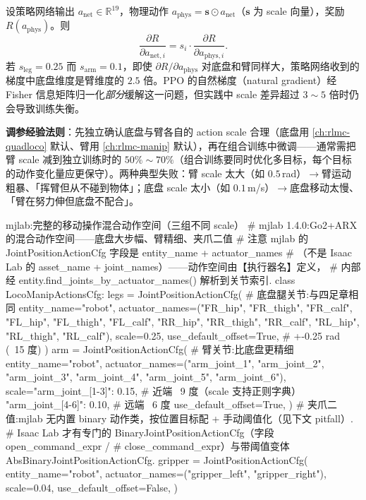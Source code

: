 \begin{derivation}\label{der:rlmc-lm-grad}
设策略网络输出 $a_{\text{net}}\in\mathbb R^{19}$，物理动作 $a_{\text{phys}}=\mathbf s\odot a_{\text{net}}$（$\mathbf s$ 为 scale 向量），奖励 $R(a_{\text{phys}})$。则
\begin{equation}
\frac{\partial R}{\partial a_{\text{net},i}} = s_i\cdot\frac{\partial R}{\partial a_{\text{phys},i}}.
\label{eq:rlmc-lm-gradchain}
\end{equation}
若 $s_{\text{leg}}=0.25$ 而 $s_{\text{arm}}=0.1$，即使 $\partial R/\partial a_{\text{phys}}$ 对底盘和臂同样大，策略网络收到的梯度中底盘维度是臂维度的 $2.5$ 倍。PPO 的自然梯度（natural gradient）经 Fisher 信息矩阵归一化\emph{部分}缓解这一问题，但实践中 scale 差异超过 $3\!\sim\!5$ 倍时仍会导致训练失衡。
\end{derivation}

\textbf{调参经验法则}：先独立确认底盘与臂各自的 action scale 合理（底盘用 \cref{ch:rlmc-quadloco} 默认、臂用 \cref{ch:rlmc-manip} 默认），再在组合训练中微调——通常需把臂 scale 减到独立训练时的 $50\%\!\sim\!70\%$（组合训练要同时优化多目标，每个目标的动作变化量应更保守）。两种典型失败：臂 scale 太大（如 $0.5\,$rad）$\to$臂运动粗暴、「挥臂但从不碰到物体」；底盘 scale 太小（如 $0.1\,$m/s）$\to$底盘移动太慢、「臂在努力伸但底盘不配合」。

\begin{codebox}[Python]{mjlab:完整的移动操作混合动作空间（三组不同 scale）}
# mjlab 1.4.0:Go2+ARX 的混合动作空间——底盘大步幅、臂精细、夹爪二值
# 注意 mjlab 的 JointPositionActionCfg 字段是 entity_name + actuator_names
#   （不是 Isaac Lab 的 asset_name + joint_names）——动作空间由【执行器名】定义，
#   内部经 entity.find_joints_by_actuator_names() 解析到关节索引.
class LocoManipActionsCfg:
    legs = JointPositionActionCfg(           # 底盘腿关节:与四足章相同
        entity_name="robot",
        actuator_names=("FR_hip", "FR_thigh", "FR_calf",
                        "FL_hip", "FL_thigh", "FL_calf",
                        "RR_hip", "RR_thigh", "RR_calf",
                        "RL_hip", "RL_thigh", "RL_calf"),
        scale=0.25, use_default_offset=True,            # +-0.25 rad (~15 度)
    )
    arm = JointPositionActionCfg(            # 臂关节:比底盘更精细
        entity_name="robot",
        actuator_names=("arm_joint_1", "arm_joint_2", "arm_joint_3",
                        "arm_joint_4", "arm_joint_5", "arm_joint_6"),
        scale={"arm_joint_[1-3]": 0.15,      # 近端 ~9 度（scale 支持正则字典）
               "arm_joint_[4-6]": 0.10},     # 远端 ~6 度
        use_default_offset=True,
    )
    # 夹爪二值:mjlab 无内置 binary 动作类，按位置目标配 + 手动阈值化（见下文 pitfall）.
    #   Isaac Lab 才有专门的 BinaryJointPositionActionCfg（字段 open_command_expr /
    #   close_command_expr）与带阈值变体 AbsBinaryJointPositionActionCfg.
    gripper = JointPositionActionCfg(
        entity_name="robot",
        actuator_names=("gripper_left", "gripper_right"),
        scale=0.04, use_default_offset=False,
    )
\end{codebox}

